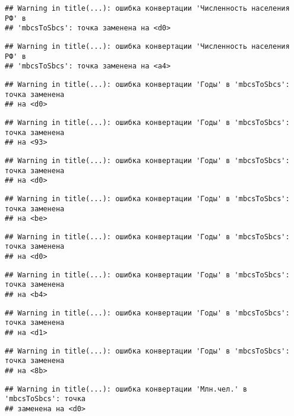 \documentclass[
]{article}
\begin{document}
\begin{verbatim}
## Warning in title(...): ошибка конвертации 'Численность населения РФ' в
## 'mbcsToSbcs': точка заменена на <d0>
\end{verbatim}

\begin{verbatim}
## Warning in title(...): ошибка конвертации 'Численность населения РФ' в
## 'mbcsToSbcs': точка заменена на <a4>
\end{verbatim}

\begin{verbatim}
## Warning in title(...): ошибка конвертации 'Годы' в 'mbcsToSbcs': точка заменена
## на <d0>
\end{verbatim}

\begin{verbatim}
## Warning in title(...): ошибка конвертации 'Годы' в 'mbcsToSbcs': точка заменена
## на <93>
\end{verbatim}

\begin{verbatim}
## Warning in title(...): ошибка конвертации 'Годы' в 'mbcsToSbcs': точка заменена
## на <d0>
\end{verbatim}

\begin{verbatim}
## Warning in title(...): ошибка конвертации 'Годы' в 'mbcsToSbcs': точка заменена
## на <be>
\end{verbatim}

\begin{verbatim}
## Warning in title(...): ошибка конвертации 'Годы' в 'mbcsToSbcs': точка заменена
## на <d0>
\end{verbatim}

\begin{verbatim}
## Warning in title(...): ошибка конвертации 'Годы' в 'mbcsToSbcs': точка заменена
## на <b4>
\end{verbatim}

\begin{verbatim}
## Warning in title(...): ошибка конвертации 'Годы' в 'mbcsToSbcs': точка заменена
## на <d1>
\end{verbatim}

\begin{verbatim}
## Warning in title(...): ошибка конвертации 'Годы' в 'mbcsToSbcs': точка заменена
## на <8b>
\end{verbatim}

\begin{verbatim}
## Warning in title(...): ошибка конвертации 'Млн.чел.' в 'mbcsToSbcs': точка
## заменена на <d0>
\end{verbatim}
\end{document}
